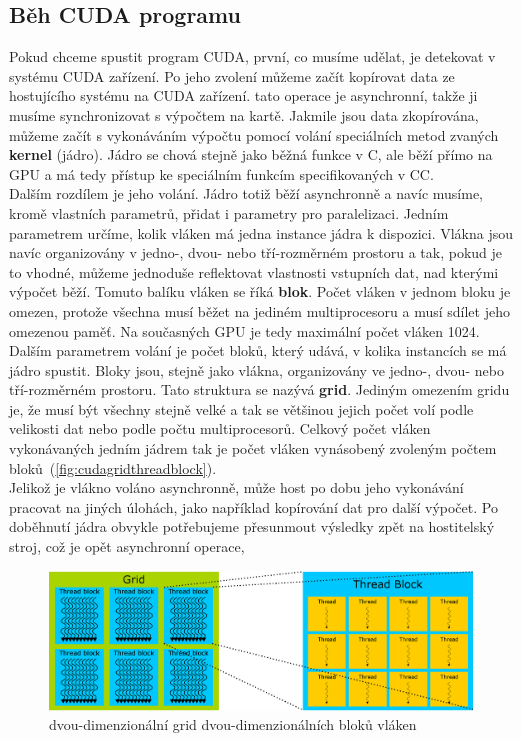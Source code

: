 \subsection{Běh CUDA programu}
Pokud chceme spustit program CUDA, první, co musíme udělat, je detekovat v systému CUDA zařízení. Po jeho zvolení můžeme začít kopírovat data ze hostujícího systému na CUDA zařízení. tato operace je asynchronní, takže ji musíme synchronizovat s výpočtem na kartě. Jakmile jsou data zkopírována, můžeme začít s vykonáváním výpočtu pomocí volání speciálních metod zvaných \textbf{kernel} (jádro). Jádro se chová stejně jako běžná funkce v C, ale běží přímo na GPU a má tedy přístup ke speciálním funkcím specifikovaných v CC.\\ 

Dalším rozdílem je jeho volání. Jádro totiž běží asynchronně a navíc musíme, kromě vlastních parametrů, přidat i parametry pro paralelizaci. Jedním parametrem určíme, kolik vláken má jedna instance jádra k dispozici. Vlákna jsou navíc organizovány v jedno-, dvou- nebo tří-rozměrném prostoru a tak, pokud je to vhodné, můžeme jednoduše reflektovat vlastnosti vstupních dat, nad kterými výpočet běží. Tomuto balíku vláken se říká \textbf{blok}. Počet vláken v jednom bloku je omezen, protože všechna musí běžet na jediném multiprocesoru a musí sdílet jeho omezenou paměť. Na současných GPU je tedy maximální počet vláken 1024.\\

Dalším parametrem volání je počet bloků, který udává, v kolika instancích se má jádro spustit. Bloky jsou, stejně jako vlákna, organizovány ve jedno-, dvou- nebo tří-rozměrném prostoru. Tato struktura se nazývá \textbf{grid}. Jediným omezením gridu je, že musí být všechny stejně velké a tak se většinou jejich počet volí podle velikosti dat nebo podle počtu multiprocesorů. Celkový počet vláken vykonávaných jedním jádrem tak je počet vláken vynásobený zvoleným počtem bloků~(\autoref{fig:cudagridthreadblock}).\\

Jelikož je vlákno voláno asynchronně, může host po dobu jeho vykonávání pracovat na jiných úlohách, jako například kopírování dat pro další výpočet. Po doběhnutí jádra obvykle potřebujeme přesunmout výsledky zpět na hostitelský stroj, což je opět asynchronní operace,\\

\begin{figure}[h]
  \centering
  \includegraphics[width=1\linewidth]{img/CUDAthreadGridBlock.eps}
  \caption{dvou-dimenzionální grid dvou-dimenzionálních bloků vláken}
  \label{fig:cudagridthreadblock}
\end{figure}

